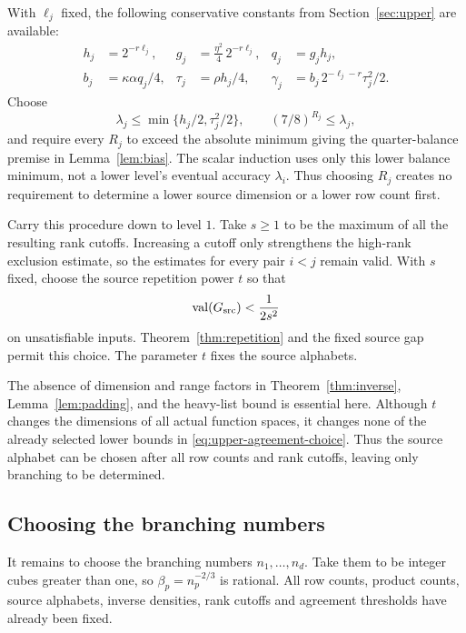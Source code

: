 With $\ell_j$ fixed, the following conservative constants from
Section~\ref{sec:upper} are available:
\begin{align}
 h_j&=2^{-r\ell_j},
 &g_j&=\frac{\eta^2}{4}\,2^{-r\ell_j},
 &q_j&=g_jh_j, \label{eq:upper-masses}\\
 b_j&=\kappa\alpha q_j/4,
 &\tau_j&=\rho h_j/4,
 &\gamma_j&=b_j\,2^{-\ell_j-r}\tau_j^2/2.
 \label{eq:upper-agreement-choice}
\end{align}
Choose
\begin{equation}\label{eq:bias-choice}
 \lambda_j\le\min\{h_j/2,\tau_j^2/2\},\qquad
 (7/8)^{R_j}\le\lambda_j,
\end{equation}
and require every $R_j$ to exceed the absolute minimum giving the
quarter-balance premise in Lemma~\ref{lem:bias}.
The scalar induction uses only this lower balance minimum, not a lower
level's eventual accuracy $\lambda_i$.
Thus choosing $R_j$ creates no requirement to determine a lower source
dimension or a lower row count first.

Carry this procedure down to level $1$.
Take $s\ge1$ to be the maximum of all the resulting rank cutoffs.
Increasing a cutoff only strengthens the high-rank exclusion estimate, so
the estimates for every pair $i<j$ remain valid.
With $s$ fixed, choose the source repetition power $t$ so that
\begin{equation}\label{eq:source-value-choice}
                \operatorname{val}(G_{\mathrm{src}})<\frac1{2s^2}
\end{equation}
on unsatisfiable inputs.
Theorem~\ref{thm:repetition} and the fixed source gap permit this choice.
The parameter $t$ fixes the source alphabets.

The absence of dimension and range factors in Theorem~\ref{thm:inverse},
Lemma~\ref{lem:padding}, and the heavy-list bound is essential here.
Although $t$ changes the dimensions of all actual function spaces, it changes
none of the already selected lower bounds in
\eqref{eq:upper-agreement-choice}.
Thus the source alphabet can be chosen after all row counts and rank
cutoffs, leaving only branching to be determined.

\subsection{Choosing the branching numbers}

It remains to choose the branching numbers $n_1,\ldots,n_d$.
Take them to be integer cubes greater than one, so
$\beta_p=n_p^{-2/3}$ is rational.
All row counts, product counts, source alphabets, inverse densities,
rank cutoffs and agreement thresholds have already been fixed.

